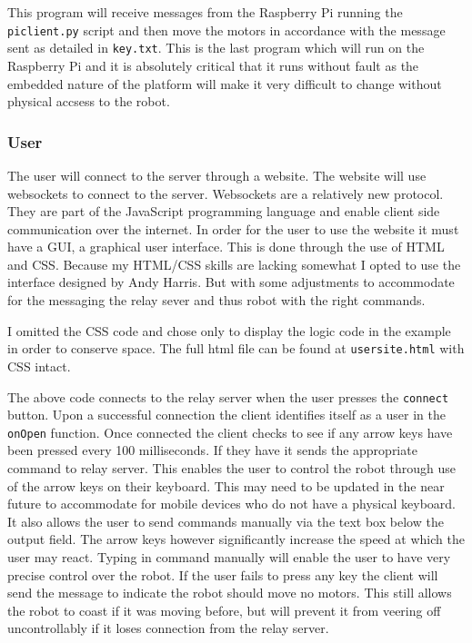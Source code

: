 \documentclass[]{report}   %
\begin{document}
						This program will receive messages from the Raspberry Pi running the \lstinline{piclient.py} script and then move the motors in accordance
						with the message sent as detailed in \lstinline{key.txt}. This is the last program which will run on the Raspberry Pi and it is absolutely
						critical that it runs without fault as the embedded nature of the platform will make it very difficult to change without physical accsess
						to the robot.

					\subsubsection{User}
						The user will connect to the server through a website. The website will use websockets to connect to the server. Websockets are a
						relatively new protocol. They are part of the JavaScript programming language and enable client side communication over the internet.
						In order for the user to use the website it must have a GUI, a graphical user interface. This is done through the use of HTML and 
						CSS. Because my HTML/CSS skills are lacking somewhat I opted to use the interface designed by Andy Harris\cite{dummies}.
						But with some adjustments to accommodate for the messaging the relay sever and thus robot with the right commands.
						
						
						I omitted the CSS code and chose only to display the logic code in the example in order to conserve space. The full html file
						can be found at \lstinline{usersite.html} with CSS intact.
						
						The above code connects to the relay server when the user presses the \lstinline{connect} button. Upon a successful connection
						the client identifies itself as a user in the \lstinline{onOpen} function. Once connected the client checks to see if any arrow
						keys have been pressed every 100 milliseconds. If they have it sends the appropriate command to relay server. This enables the
						user to control the robot through use of the arrow keys on their keyboard. This may need to be updated in the near future to
						accommodate for mobile devices who do not have a physical keyboard. It also allows the user to send commands manually via the
						text box below the output field. The arrow keys however significantly increase the speed at which the user may react. Typing in
						command manually will enable the user to have very precise control over the robot. If the user fails to press any key the client
						will send the message to indicate the robot should move no motors. This still allows the robot to coast if it was moving before,
						but will prevent it from veering off uncontrollably if it loses connection from the relay server.
						
\end{document}
